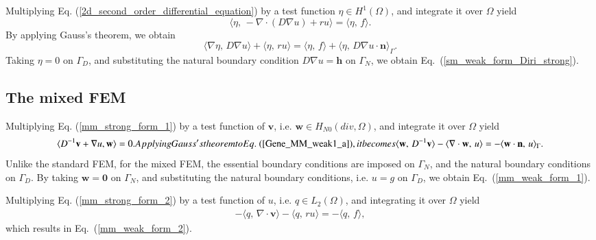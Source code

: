 \documentclass[review,3p]{elsarticle}
\begin{document}
Multiplying Eq. (\ref{2d_second_order_differential_equation}) by a test function $\eta \in H ^1 (\Omega)$, and integrate it over $\Omega$ yield
\begin{equation}
\langle \eta, \, - \nabla \cdot \left( D \nabla u \right) + ru \rangle = \langle \eta, \, f \rangle. \label{1D_general_inte}
\end{equation}
By applying Gauss's theorem, we obtain
\begin{equation}
 \langle {\nabla \eta}, \, D \nabla u \rangle + \langle \eta, \, ru \rangle = \langle \eta, \, f \rangle + \langle \eta, \, D \nabla u \cdot \mathbf{n} \rangle_{ {\Gamma}}.		\label{1D_general_gauss}
\end{equation}
Taking $\eta=0$ on $\Gamma_{D}$, and substituting the natural boundary condition $D \nabla u=\mathbf{h}$ on $\Gamma_N$, we obtain Eq.~({\ref{sm_weak_form_Diri_strong}}).

\subsection{The mixed FEM}		\label{derivation_weak_form_MM}
Multiplying Eq. (\ref{mm_strong_form_1}) by a test function of $\mathbf{v}$, i.e. $\mathbf{w} \in H _{N0}(div, \Omega)$, and integrate it over $\Omega$ yield
\begin{subequations}
\begin{align}
  \langle D^{-1}\mathbf{v} + \nabla u, \mathbf{w} \rangle = 0.	\label{Gene_MM_weak1_a}
\end{align}
Applying Gauss's theorem to Eq.~(\ref{Gene_MM_weak1_a}), it becomes
\begin{align}
 \langle \mathbf{w}, \, D^{-1}\mathbf{v} \rangle - \langle \nabla \cdot \mathbf{w}, \,  u \rangle = -\langle \mathbf{w} \cdot \mathbf{n}, \, u \rangle_{\Gamma}.		\label{Gene_MM_weak1_b}
\end{align}				\label{Gene_MM_weak1}%
\end{subequations}
Unlike the standard FEM, for the mixed FEM, the essential boundary conditions are imposed on $\Gamma _N$, and the natural boundary conditions on $\Gamma _D$.
By taking $\mathbf{w}=\mathbf{0}$ on $\Gamma_{N}$, and substituting the natural boundary conditions, i.e. $u=g$ on $\Gamma_D$, we obtain Eq.~(\ref{mm_weak_form_1}).

Multiplying Eq. (\ref{mm_strong_form_2}) by a test function of $u$, i.e. $q \in L_2 (\Omega)$, and integrating it over $\Omega$ yield
\begin{align}
- \langle q , \, \nabla \cdot \mathbf{v} \rangle - \langle q, \, ru \rangle = - \langle q, \, f \rangle, \label{Gene_MM_weak2}
\end{align}
which results in Eq.~(\ref{mm_weak_form_2}).
\end{document}
